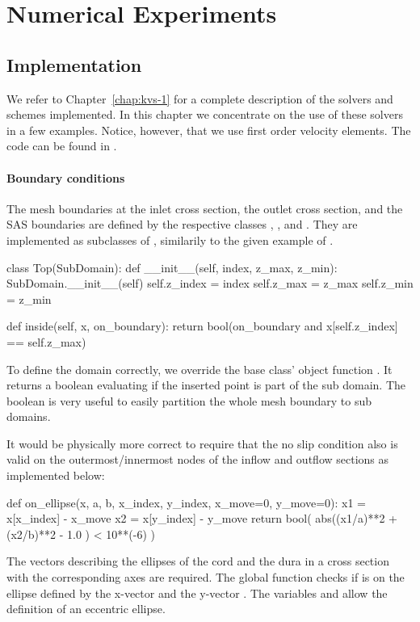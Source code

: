 \section{Numerical Experiments}
\begin{minipage}{10cm}
\subsection{Implementation}
We refer to Chapter~\ref{chap:kvs-1} for a complete description of the solvers 
and schemes implemented. In this chapter we concentrate on the use  
of these solvers in a few examples. Notice, however, that we use
first order velocity elements. The code can be found in .  

\end{minipage}

\paragraph{Boundary conditions}  
The mesh boundaries at the inlet cross section, the outlet cross section, and the SAS boundaries are defined by the respective classes , , and . They are implemented as subclasses of , similarily to the given example of .
\begin{python}
class Top(SubDomain):
	def __init__(self, index, z_max, z_min):
		SubDomain.__init__(self)
		self.z_index = index
		self.z_max = z_max
		self.z_min = z_min

	def inside(self, x, on_boundary):
		return bool(on_boundary and x[self.z_index] == self.z_max)
\end{python}
To define the domain correctly, we override the base class' object function . It returns a boolean evaluating if the inserted point  is part of the sub domain. The boolean  is very useful to easily partition the whole mesh boundary to sub domains.

It would be physically more correct to require that the no slip condition also is valid on the outermost/innermost nodes of the inflow and outflow sections as implemented below:
\begin{python}
def on_ellipse(x, a, b, x_index, y_index, x_move=0, y_move=0):
	x1 = x[x_index] - x_move
	x2 = x[y_index] - y_move
	return bool( abs((x1/a)**2 + (x2/b)**2 - 1.0 ) < 10**(-6) )
\end{python}
The vectors describing the ellipses of the cord and the dura in a cross section with the corresponding axes are required. The global function  checks if  is on the ellipse defined by the x-vector  and the y-vector . The variables  and  allow the definition of an eccentric ellipse.

